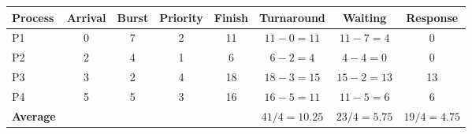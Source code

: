 \begin{tabular}{@{}lccccccc@{}}
\toprule
\textbf{Process} & \textbf{Arrival} & \textbf{Burst} & \textbf{Priority} & \textbf{Finish} & \textbf{Turnaround} & \textbf{Waiting} & \textbf{Response}\\
\midrule
P1 & 0 & 7 & 2 & 11 & $11-0=11$ & $11-7=4$ & 0\\
P2 & 2 & 4 & 1 & 6 & $6-2=4$ & $4-4=0$ & 0\\
P3 & 3 & 2 & 4 & 18 & $18-3=15$ & $15-2=13$ & 13\\
P4 & 5 & 5 & 3 & 16 & $16-5=11$ & $11-5=6$ & 6\\
\midrule
\textbf{Average} &  &  &  &  & $41/4=10.25$ & $23/4=5.75$ & $19/4=4.75$\\
\bottomrule
\end{tabular}
